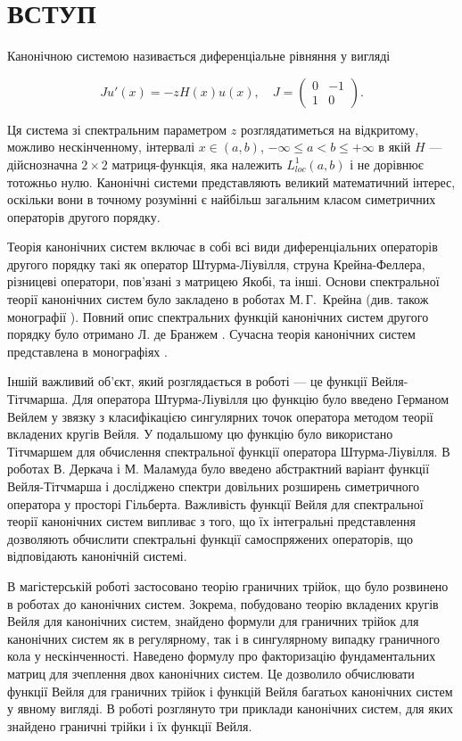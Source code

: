 
\section*{ВСТУП}


Канонічною системою називається диференціальне рівняння у вигляді

\begin{equation*} 
	Ju'(x) = -zH(x)u(x), \quad
	J=
	\begin{pmatrix}
		0 & -1\\
		1 & 0
	\end{pmatrix}.
\end{equation*}

Ця система зі спектральним параметром $z$ розглядатиметься на відкритому, можливо нескінченному, інтервалі $x\in (a,b)$, $-\infty\le a<b \le +\infty$ в якій $H$ --- дійснозначна $2\times 2$ матриця-функція, яка належить $L^1_{loc}(a,b)$ і не дорівнює тотожньо нулю. Канонічні системи представляють великий математичний інтерес, оскільки вони в точному розумінні є найбільш загальним класом симетричних операторів другого порядку.\cite{Remling2018}

Теорія канонічних систем включає в собі всі види диференціальних операторів другого порядку такі як оператор Штурма-Ліувілля, струна Крейна-Феллера, різницеві оператори, пов'язані з матрицею Якобі, та інші. Основи спектральної теорії канонічних систем було закладено в роботах М.\,Г.~Крейна (див. також монографії \cite{KreinGohb,Atkinson}). Повний опис спектральних функцій канонічних систем другого порядку було отримано Л. де Бранжем \cite{deBranges}. Сучасна теорія канонічних систем представлена в монографіях \cite{ArovD12,Remling2018,Sakhnovich}.

Іншій важливий об'єкт, який розглядається в роботі --- це функції Вейля-Тітчмарша.  Для оператора Штурма-Ліувілля цю функцію було введено Германом Вейлем у звязку з класифікацією сингулярних точок оператора методом теорії вкладених кругів Вейля. У подальшому цю функцію було використано Тітчмаршем для обчислення спектральної функції оператора Штурма-Ліувілля. В роботах В. Деркача і М. Маламуда було введено абстрактний варіант функції Вейля-Тітчмарша і досліджено спектри довільних розширень симетричного оператора у просторі Гільберта.
Важливість функції Вейля для спектральної теорії канонічних систем  випливає з того, що їх інтегральні представлення дозволяють обчислити спектральні функції самоспряжених операторів, що відповідають канонічній системі.

В магістерській роботі застосовано теорію граничних трійок, що було розвинено в роботах \cite{Koch1975,Gorb1991} до канонічних систем. Зокрема, побудовано  теорію вкладених кругів Вейля для канонічних систем, знайдено формули для граничних трійок для канонічних систем як в регулярному, так і в сингулярному випадку  граничного кола у нескінченності. Наведено формулу про факторизацію фундаментальних матриц для зчеплення двох канонічних систем. Це дозволило обчислювати функції Вейля для граничних трійок і функцій Вейля багатьох канонічних систем у явному вигляді. В роботі розглянуто три приклади канонічних систем, для яких знайдено граничні трійки і їх функції Вейля.